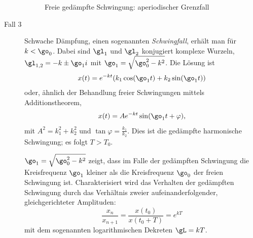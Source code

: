 \documentclass[%
draft,
11pt,%
twoside,%
titlepage,%
german,%
headsepline%
]{scrartcl}
\begin{document}
\begin{description}
\begin{figure}
\begin{center}
\end{center}
\caption{Freie ged\"ampfte Schwingung: aperiodischer Grenzfall}
\end{figure}

\item[Fall 3] Schwache D\"ampfung, einen sogenannten \emph{Schwingfall}, erh\"alt man f\"ur $k<\go_0$.
Dabei sind $\gl_1$ und $\gl_2$ konjugiert komplexe Wurzeln, $\gl_{1,2}=-k\pm\go_1i$ mit $\go_1=\sqrt{\go_0^2-k^2}$. Die L\"osung ist
$$x(t)=e^{-kt}(k_1\cos(\go_1 t)+k_2\sin(\go_1 t))$$
oder, \"ahnlich der Behandlung freier Schwingungen mittels Additionstheorem,
$$x(t)=Ae^{-kt}\sin(\go_1 t+\varphi),$$
mit $A^2=k_1^2+k_2^2$ und $\tan\varphi=\frac{k_1}{k_2}$. Dies ist die ged\"ampfte harmonische Schwingung; es folgt $T>T_0$.

$\go_1=\sqrt{\go_0^2-k^2}$ zeigt, dass im Falle der ged\"ampften Schwingung die Kreisfrequenz $\go_1$ kleiner als die Kreisfrequenz $\go_0$ der freien Schwingung ist. Charakterisiert wird das Verhalten der ged\"ampften Schwingung durch das Verh\"altnis zweier aufeinanderfolgender, gleichgerichteter Amplituden:
$$\frac{x_n}{x_{n+1}}=\frac{x(t_0)}{x(t_0+T)}=e^{kT}$$
mit dem sogenannten logarithmischen Dekreten $\gL=kT$.


\end{description}
\end{document}
